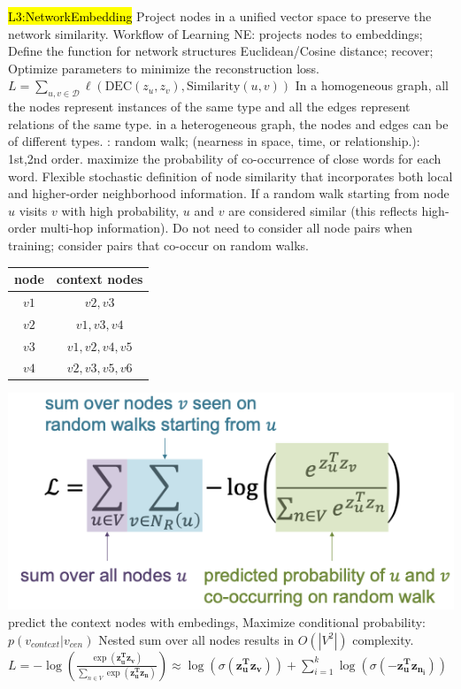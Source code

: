 \hl{L3:NetworkEmbedding} 
Project nodes in a unified vector space to preserve the network similarity. Workflow of Learning NE:  projects nodes to embeddings; Define the  function for network structures Euclidean/Cosine distance;  recover; Optimize parameters to minimize the reconstruction loss.
$L = \sum_{u,v \in \mathcal{D}} \ell( \mathrm{DEC}(z_u, z_v),\mathrm{Similarity}(u,v))$
 In a homogeneous graph, all the nodes represent instances of the same type and all the edges represent relations of the same type. in a heterogeneous graph, the nodes and edges can be of different types.
 : random walk; (nearness in space, time, or relationship.): 1st,2nd order.
 maximize the probability of co-occurrence of close words for each word.
 Flexible stochastic definition of node similarity that incorporates both local and higher-order neighborhood information. If a random walk starting from node \( u \) visits \( v \) with high probability, \( u \) and \( v \) are considered similar (this reflects high-order multi-hop information).
 Do not need to consider all node pairs when training; consider pairs that co-occur on random walks.
\begin{tabular}{|c|c|}
\hline
\textbf{node} & \textbf{context nodes} \\
\hline
$v1$ & $v2,v3$ \\
$v2$ & $v1,v3,v4$ \\
$v3$ & $v1,v2,v4,v5$ \\
$v4$ & $v2,v3,v5,v6$ \\
\hline
\end{tabular} \includegraphics[height=0.045\textwidth]{figs/l3-1.png}
 predict the context nodes with embedings, Maximize conditional probability:\(p(v_{context} | v_{cen})\)
 Nested sum over all nodes results in \( O(|V^{2}|) \) complexity.
\(L=-\log\left(\frac{\exp(\mathbf{z_u^T z_v})}{\sum_{n \in V} \exp(\mathbf{z_u^T z_n})}\right) \approx \log\left(\sigma(\mathbf{z_u^T z_v})\right) + \sum_{i=1}^{k} \log\left(\sigma(-\mathbf{z_u^T z_{n_i}})\right)\) 
